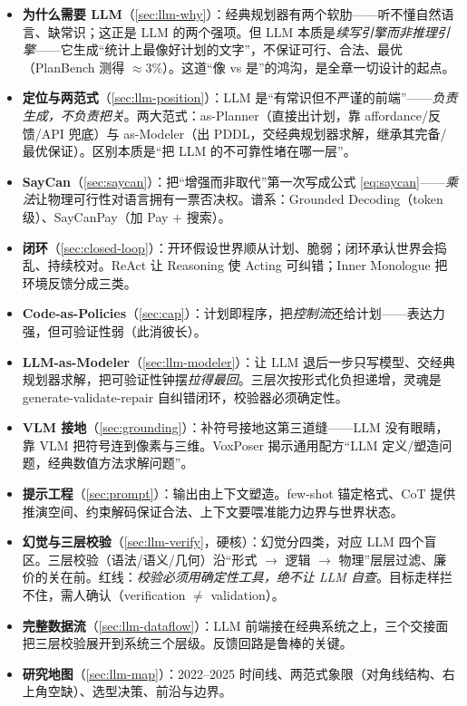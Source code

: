 \begin{itemize}
  \item \textbf{为什么需要 LLM}（\cref{sec:llm-why}）：经典规划器有两个软肋——听不懂自然语言、缺常识；这正是 LLM 的两个强项。但 LLM 本质是\emph{续写引擎而非推理引擎}——它生成“统计上最像好计划的文字”，不保证可行、合法、最优（PlanBench 测得 $\approx 3\%$）。这道“像 vs 是”的鸿沟，是全章一切设计的起点。
  \item \textbf{定位与两范式}（\cref{sec:llm-position}）：LLM 是“有常识但不严谨的前端”——\emph{负责生成，不负责把关}。两大范式：as-Planner（直接出计划，靠 affordance/反馈/API 兜底）与 as-Modeler（出 PDDL，交经典规划器求解，继承其完备/最优保证）。区别本质是“把 LLM 的不可靠性堵在哪一层”。
  \item \textbf{SayCan}（\cref{sec:saycan}）：把“增强而非取代”第一次写成公式 \cref{eq:saycan}——\emph{乘法}让物理可行性对语言拥有一票否决权。谱系：Grounded Decoding（token 级）、SayCanPay（加 Pay $+$ 搜索）。
  \item \textbf{闭环}（\cref{sec:closed-loop}）：开环假设世界顺从计划、脆弱；闭环承认世界会捣乱、持续校对。ReAct 让 Reasoning 使 Acting 可纠错；Inner Monologue 把环境反馈分成三类。
  \item \textbf{Code-as-Policies}（\cref{sec:cap}）：计划即程序，把\emph{控制流}还给计划——表达力强，但可验证性弱（此消彼长）。
  \item \textbf{LLM-as-Modeler}（\cref{sec:llm-modeler}）：让 LLM 退后一步只写模型、交经典规划器求解，把可验证性钟摆\emph{拉得最回}。三层次按形式化负担递增，灵魂是 generate-validate-repair 自纠错闭环，校验器必须确定性。
  \item \textbf{VLM 接地}（\cref{sec:grounding}）：补符号接地这第三道缝——LLM 没有眼睛，靠 VLM 把符号连到像素与三维。VoxPoser 揭示通用配方“LLM 定义/塑造问题，经典数值方法求解问题”。
  \item \textbf{提示工程}（\cref{sec:prompt}）：输出由上下文塑造。few-shot 锚定格式、CoT 提供推演空间、约束解码保证合法、上下文要喂准能力边界与世界状态。
  \item \textbf{幻觉与三层校验}（\cref{sec:llm-verify}，硬核）：幻觉分四类，对应 LLM 四个盲区。三层校验（语法/语义/几何）沿“形式 $\to$ 逻辑 $\to$ 物理”层层过滤、廉价的关在前。红线：\emph{校验必须用确定性工具，绝不让 LLM 自查}。目标走样拦不住，需人确认（verification $\neq$ validation）。
  \item \textbf{完整数据流}（\cref{sec:llm-dataflow}）：LLM 前端接在经典系统之上，三个交接面把三层校验展开到系统三个层级。反馈回路是鲁棒的关键。
  \item \textbf{研究地图}（\cref{sec:llm-map}）：2022--2025 时间线、两范式象限（对角线结构、右上角空缺）、选型决策、前沿与边界。
\end{itemize}

